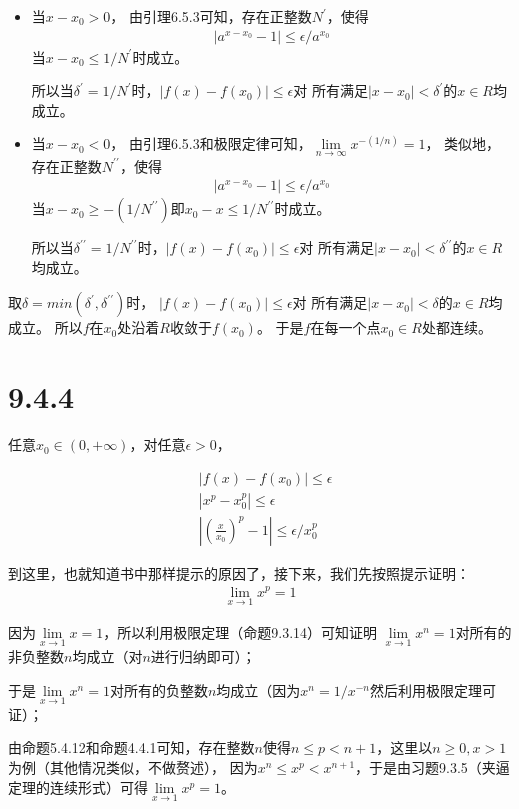 \documentclass{article}
\begin{document}
\begin{itemize}
  \item  当$x - x_0 > 0$，
        由引理6.5.3可知，存在正整数$N^\prime$，使得
        \begin{align*}
          |a^{x-x_0} - 1| \leq \epsilon / a^{x_0}
        \end{align*}
        当$x-x_0 \leq 1/N^\prime$时成立。

        所以当$\delta^\prime = 1/N^\prime$时，$|f(x) - f(x_0)| \leq \epsilon$对
        所有满足$|x - x_0| < \delta^\prime$的$x \in R$均成立。
  \item 当$x - x_0 < 0$，
        由引理6.5.3和极限定律可知，$\lim\limits_{n \rightarrow \infty} x^{-(1/n)} = 1$，
        类似地，存在正整数$N^{\prime\prime}$，使得
        \begin{align*}
          |a^{x-x_0} - 1| \leq \epsilon / a^{x_0}
        \end{align*}
        当$x-x_0 \geq -(1/N^{\prime\prime})$即$x_0 - x \leq 1/N^{\prime\prime}$时成立。

        所以当$\delta^{\prime\prime} = 1/N^{\prime\prime}$时，$|f(x) - f(x_0)| \leq \epsilon$对
        所有满足$|x - x_0| < \delta^{\prime\prime}$的$x \in R$均成立。
\end{itemize}
取$\delta = min(\delta^\prime, \delta^{\prime\prime})$时，
$|f(x) - f(x_0)| \leq \epsilon$对
所有满足$|x - x_0| < \delta$的$x \in R$均成立。
所以$f$在$x_0$处沿着$R$收敛于$f(x_0)$。
于是$f$在每一个点$x_0 \in R$处都连续。

\section*{9.4.4}

任意$x_0 \in (0, +\infty)$，对任意$\epsilon > 0$，

\begin{align*}
   & |f(x) - f(x_0)| \leq \epsilon                   \\
   & |x^p - x_0^p| \leq \epsilon                     \\
   & | (\frac{x}{x_0})^p - 1 | \leq \epsilon / x_0^p
\end{align*}

\begin{zremark}
  到这里，也就知道书中那样提示的原因了，接下来，我们先按照提示证明：
  \begin{align*}
    \lim\limits_{x \rightarrow 1} x^p = 1
  \end{align*}

  因为$\lim\limits_{x \rightarrow 1} x = 1$，所以利用极限定理（命题9.3.14）可知证明
  $\lim\limits_{x \rightarrow 1} x^n = 1$对所有的非负整数$n$均成立（对$n$进行归纳即可）；

  于是$\lim\limits_{x \rightarrow 1} x^n = 1$对所有的负整数$n$均成立（因为$x^n = 1/x^{-n}$然后利用极限定理可证）；

  由命题5.4.12和命题4.4.1可知，存在整数$n$使得$n \leq p < n+1$，这里以$n \geq 0, x > 1$为例（其他情况类似，不做赘述），
  因为$x^n \leq x^p < x^{n+1}$，于是由习题9.3.5（夹逼定理的连续形式）可得$\lim\limits_{x \rightarrow 1} x^p = 1$。
\end{zremark}
\end{document}
